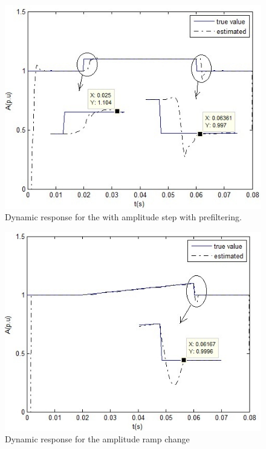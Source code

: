 \documentclass{UCF_ETD}
\begin{document}
\begin{figure}[H]
\begin{center}
\includegraphics[scale=0.75]{BLMS_Figures/DynamicResAmpStepFiltered}
\caption{Dynamic response for the with amplitude step with prefiltering.}
\label{DynamicResAmpStepFiltered}
\end{center}
\end{figure}

\begin{figure}[H]
\begin{center}
\includegraphics[scale=0.75]{BLMS_Figures/DynamicRampTest}
\caption{Dynamic response for the amplitude ramp change}
\label{DynamicRampTest}
\end{center}
\end{figure}
\end{document}
